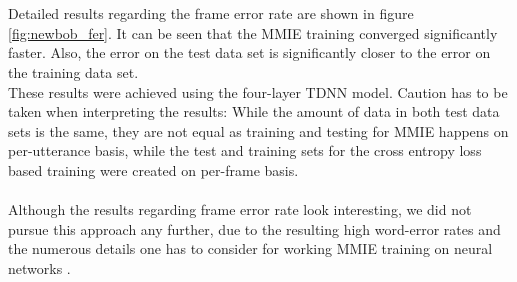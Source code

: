 \begin{minipage}{\linewidth}
	\begin{minipage}{0.5\linewidth}
\end{minipage}
\hfill
\begin{minipage}{0.5\linewidth}
\end{minipage}
	\label{fig:newbob_fer}
\end{minipage} \\ \\
Detailed results regarding the frame error rate are shown in figure \ref{fig:newbob_fer}. It can be seen that the MMIE training converged significantly faster. Also, the error on the test data set is significantly closer to the error on the training data set. \\ These results were achieved using the four-layer TDNN model. Caution has to be taken when interpreting the results: While the amount of data in both test data sets is the same, they are not equal as training and testing for MMIE happens on per-utterance basis, while the test and training sets for the cross entropy loss based training were created on per-frame basis. \\ \\
Although the results regarding frame error rate look interesting, we did not pursue this approach any further, due to the resulting high word-error rates and the numerous details one has to consider for working MMIE training on neural networks \cite{su2013error}.


